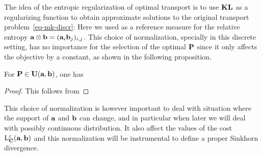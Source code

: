 The idea of the entropic regularization of optimal transport is to use $\KLD$ as a regularizing function to obtain approximate solutions to the original transport problem~\eqref{eq-mk-discr}:
Here we used as a reference measure for the relative entropy $\a \otimes \b = (\a_i \b_j)_{i,j}$.
%
This choice of normalization, specially in this discrete setting, has no importance for the selection of the optimal $\P$ since it only affects the objective by a constant, as shown in the following proposition.

\begin{prop} For $\P \in \CouplingsD(\a,\b)$, one has
\end{prop}

\begin{proof}
This follows from 
\end{proof}

This choice of normalization is however important to deal with situation where the support of $\a$ and $\b$ can change, and in particular when later we will deal with possibly continuous distribution. It also affect the values of the cost $\MKD_\C^\epsilon(\a,\b)$ and this normalization will be instrumental to define a proper Sinkhorn divergence. 






